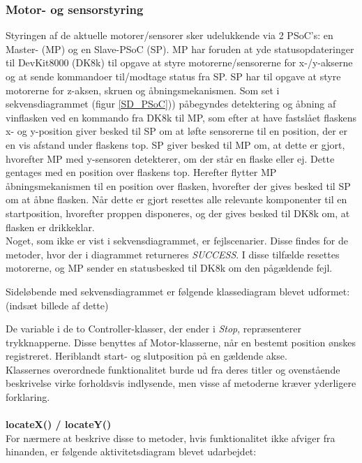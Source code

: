 \subsubsection{Motor- og sensorstyring}

Styringen af de aktuelle motorer/sensorer sker udelukkende via 2 PSoC's: en Master- (MP) og en Slave-PSoC (SP). MP har foruden at yde statusopdateringer til DevKit8000 (DK8k) til opgave at styre motorerne/sensorerne for x-/y-akserne og at sende kommandoer til/modtage status fra SP. SP har til opgave at styre motorerne for z-aksen, skruen og åbningsmekanismen. Som set i sekvensdiagrammet (figur \ref{SD_PSoC})) påbegyndes detektering og åbning af vinflasken ved en kommando fra DK8k til MP, som efter at have fastslået flaskens x- og y-position giver besked til SP om at løfte sensorerne til en position, der er en vis afstand under flaskens top. SP giver besked til MP om, at dette er gjort, hvorefter MP med y-sensoren detekterer, om der står en flaske eller ej. Dette gentages med en position over flaskens top. Herefter flytter MP åbningsmekanismen til en position over flasken, hvorefter der gives besked til SP om at åbne flasken. Når dette er gjort resettes alle relevante komponenter til en startposition, hvorefter proppen disponeres, og der gives besked til DK8k om, at flasken er drikkeklar. \\
Noget, som ikke er vist i sekvensdiagrammet, er fejlscenarier. Disse findes for de metoder, hvor der i diagrammet returneres \textit{SUCCESS}. I disse tilfælde resettes motorerne, og MP sender en statusbesked til DK8k om den pågældende fejl.

Sideløbende med sekvensdiagrammet er følgende klassediagram blevet udformet: (indsæt billede af dette)

De variable i de to Controller-klasser, der ender i \textit{Stop}, repræsenterer trykknapperne. Disse benyttes af Motor-klasserne, når en bestemt position ønskes registreret. Heriblandt start- og slutposition på en gældende akse. \\
Klassernes overordnede funktionalitet burde ud fra deres titler og ovenstående beskrivelse virke forholdsvis indlysende, men visse af metoderne kræver yderligere forklaring.
\\
\\
\textbf{locateX() / locateY()} \\
For nærmere at beskrive disse to metoder, hvis funktionalitet ikke afviger fra hinanden, er følgende aktivitetsdiagram blevet udarbejdet: \\

